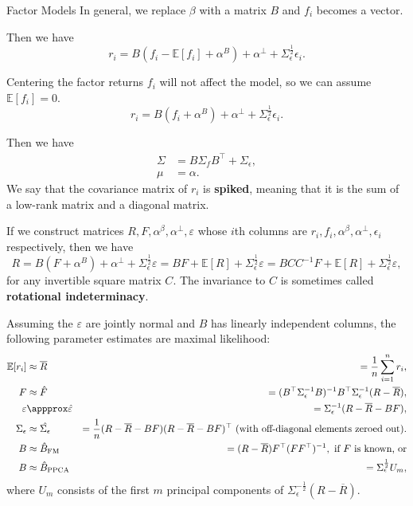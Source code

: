 \documentclass{beamer}
\begin{document}
\begin{frame}{Factor Models}
	In general, we replace $\beta$ with a matrix $B$ and $f_i$ becomes a vector.

	Then we have
	$$r_i = B(f_i-\mathbb{E}[f_i] + \alpha^B) + \alpha^\bot + \Sigma_\epsilon^\frac{1}{2}\epsilon_i.$$

	Centering the factor returns $f_i$ will not affect the model, so we can assume $\mathbb{E}[f_i]=0$.
	$$r_i = B(f_i + \alpha^B) + \alpha^\bot + \Sigma_\epsilon^\frac{1}{2}\epsilon_i.$$

	Then we have
	\begin{align*}
		\Sigma	&= B \Sigma_f B^\top + \Sigma_\epsilon,
	\\	\mu	&= \alpha.
	\end{align*}
	We say that the covariance matrix of $r_i$ is \textbf{spiked}, meaning that it is the sum of a low-rank matrix and a diagonal matrix.

	If we construct matrices $R,F,\alpha^\beta,\alpha^\bot,\varepsilon$ whose $i$th columns are $r_i,f_i,\alpha^\beta,\alpha^\bot,\epsilon_i$ respectively, then we have
	$$R = B(F + \alpha^B) + \alpha^\bot + \Sigma_\epsilon^\frac{1}{2}\varepsilon = BF + \mathbb{E}[R] + \Sigma_\epsilon^\frac{1}{2}\varepsilon = BCC^{-1}F + \mathbb{E}[R] + \Sigma_\epsilon^\frac{1}{2}\varepsilon,$$
	for any invertible square matrix $C$. The invariance to $C$ is sometimes called \textbf{rotational indeterminacy}.

	Assuming the $\varepsilon$ are jointly normal and $B$ has linearly independent columns, the following parameter estimates are maximal likelihood:
	\begin{align*}
		\mathbb{E}[r_i]		&\approx \overline{R}		&= \frac{1}{n}\sum_{i=1}^n r_i,
	\\	F			&\approx \hat{F}		&= (B^\top \Sigma_\epsilon^{-1} B)^{-1}B^\top \Sigma_\epsilon^{-1}(R-\overline{R}),
	\\	\varepsilon		&\appprox \hat{\varepsilon}	&= \Sigma_\epsilon^{-1} (R-\overline{R}-BF),
	\\	\Sigma_\epsilon		&\approx \hat{\Sigma_\epsilon}	&= \frac{1}{n}(R-\overline{R}-BF)(R-\overline{R}-BF)^\top \textrm{ (with off-diagonal elements zeroed out)}.
	\\	B			&\approx \hat{B}_\textrm{FM}	&= (R-\overline{R})F^\top (FF^\top)^{-1},\textrm{ if }F\textrm{ is known, or}%
	\\	B			&\approx \hat{B}_\textrm{PPCA}	&= \Sigma_\epsilon^\frac{1}{2} U_m,%
	\end{align*}
	where $U_m$ consists of the first $m$ principal components of $\Sigma_\epsilon^{-\frac{1}{2}}(R-\overline{R})$.%


\end{frame}
\end{document}

